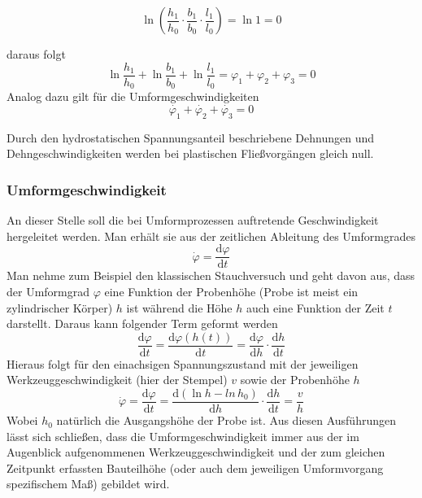 \documentclass[12pt,a4paper,parskip,twoside,BCOR5mm,headsepline]{scrartcl}
\begin{document}
\begin{description*}
 
 \begin{equation}\ln (\frac{h_1}{h_0} \cdot \frac{b_1}{b_0} \cdot \frac{l_1}{l_0}) = \ln 1 = 0\end{equation} 
 
daraus folgt \begin{equation}
\ln\frac{h_1}{h_0}+\ln\frac{b_1}{b_0}+\ln\frac{l_1}{l_0}=\varphi_1+\varphi_2+\varphi_3=0
\end{equation}
Analog dazu gilt für die Umformgeschwindigkeiten
\begin{equation}
\dot{\varphi_1}+\dot{\varphi_2}+\dot{\varphi_3}=0
\end{equation}

Durch den hydrostatischen Spannungsanteil beschriebene Dehnungen und Dehngeschwindigkeiten werden bei plastischen Fließvorgängen gleich null.\autocite[24-28]{fu}
\subsubsection{Umformgeschwindigkeit}
An dieser Stelle soll die bei Umformprozessen auftretende Geschwindigkeit hergeleitet werden. Man erhält sie aus der zeitlichen Ableitung des Umformgrades
\begin{equation}
\dot{\varphi} = \frac{\text{d}\varphi}{\text{d}t}
\end{equation}
Man nehme zum Beispiel den klassischen Stauchversuch und geht davon aus, dass der Umformgrad $ \varphi $ eine Funktion der Probenhöhe (Probe ist meist ein zylindrischer Körper) $ h $ ist während die Höhe $ h $ auch eine Funktion der Zeit $ t $ darstellt. Daraus kann folgender Term geformt werden 
\begin{equation}
\frac{\text{d}\varphi}{\text{d}t} = \frac{\text{d} \varphi (h(t))}{\text{d}t}= \frac{\text{d}\varphi}{\text{d}h} \cdot \frac{\text{d}h}{\text{d}t}
\end{equation}
Hieraus folgt für den einachsigen Spannungszustand mit der jeweiligen Werkzeuggeschwindigkeit (hier der Stempel) $ v $ sowie der Probenhöhe $ h $
\begin{equation}
\dot{\varphi}=\frac{\text{d}\varphi}{\text{d}t}= \frac{\text{d}(\ln h - ln  \, h_0)}{\text{d}h}\cdot \frac{\text{d}h}{\text{d}t} = \frac{v}{h}
\end{equation}
Wobei $ h_0 $ natürlich die Ausgangshöhe der Probe ist.\autocite[65]{hu}
Aus diesen Ausführungen lässt sich schließen,  dass die Umformgeschwindigkeit immer aus der im Augenblick aufgenommenen Werkzeuggeschwindigkeit und der zum gleichen Zeitpunkt erfassten Bauteilhöhe (oder auch dem jeweiligen Umformvorgang spezifischem   Maß) gebildet wird.

\end{description*}
\end{document}
